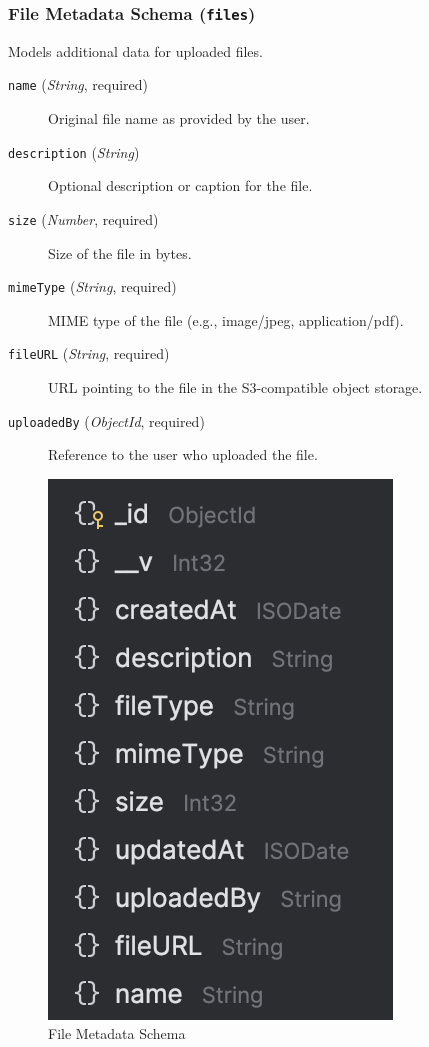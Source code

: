 \subsubsection{File Metadata Schema (\texttt{files})}
Models additional data for uploaded files.
\begin{description}
  \item [\texttt{name} (\emph{String}, required)]  
    Original file name as provided by the user. 
  \item [\texttt{description} (\emph{String})]  
    Optional description or caption for the file.
  \item [\texttt{size} (\emph{Number}, required)]  
    Size of the file in bytes.
  \item [\texttt{mimeType} (\emph{String}, required)]  
    MIME type of the file (e.g., image/jpeg, application/pdf).
  \item [\texttt{fileURL} (\emph{String}, required)]  
    URL pointing to the file in the S3-compatible object storage.
  \item [\texttt{uploadedBy} (\emph{ObjectId}, required)]
    Reference to the user who uploaded the file.
\end{description}

\begin{figure}[H]
  \centering
  \includegraphics{file-schema.png}
  \caption*{File Metadata Schema}
  \label{fig:file-schema}
\end{figure}


